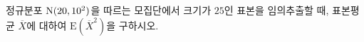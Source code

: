 정규분포 $\mathrm{N}(20{,}\mkern3mu\mathopen{}10^2)$을 따르는 모집단에서 크기가 $25$인 표본을 임의추출할 때, 표본평균 $\overline{X}$에 대하여 $\mathrm{E}(\overline{X}^2)$을 구하시오.

